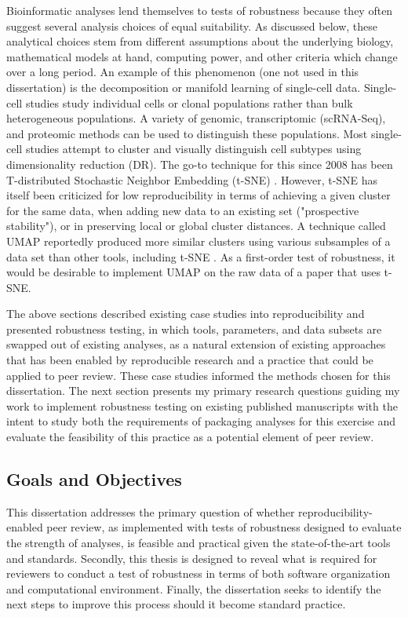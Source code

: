\documentclass{drexelthesis}
\begin{document}
Bioinformatic analyses lend themselves to tests of robustness because they often suggest several analysis choices of equal suitability. As discussed below, these analytical choices stem from different assumptions about the underlying biology, mathematical models at hand, computing power, and other criteria which change over a long period. An example of this phenomenon (one not used in this dissertation) is the decomposition or manifold learning of single-cell data. Single-cell studies study individual cells or clonal populations rather than bulk heterogeneous populations. A variety of genomic, transcriptomic (scRNA-Seq), and proteomic methods can be used to distinguish these populations. Most single-cell studies attempt to cluster and visually distinguish cell subtypes using dimensionality reduction (DR). The go-to technique for this since 2008 has been T-distributed Stochastic Neighbor Embedding (t-SNE) \cite{Van_der_Maaten2008-bm}. However, t-SNE has itself been criticized for low reproducibility in terms of achieving a given cluster for the same data, when adding new data to an existing set ("prospective stability"), or in preserving local or global cluster distances. A technique called UMAP reportedly produced more similar clusters using various subsamples of a data set than other tools, including t-SNE \cite{Becht2018-df}. As a first-order test of robustness, it would be desirable to implement UMAP on the raw data of a paper that uses t-SNE.

The above sections described existing case studies into reproducibility and presented robustness testing, in which tools, parameters, and data subsets are swapped out of existing analyses, as a natural extension of existing approaches that has been enabled by reproducible research and a practice that could be applied to peer review. These case studies informed the methods chosen for this dissertation. The next section presents my primary research questions guiding my work to implement robustness testing on existing published manuscripts with the intent to study both the requirements of packaging analyses for this exercise and evaluate the feasibility of this practice as a potential element of peer review.

\subsection{Goals and Objectives}

This dissertation addresses the primary question of whether reproducibility-enabled peer review, as implemented with tests of robustness designed to evaluate the strength of analyses, is feasible and practical given the state-of-the-art tools and standards. Secondly, this thesis is designed to reveal what is required for reviewers to conduct a test of robustness in terms of both software organization and computational environment. Finally, the dissertation seeks to identify the next steps to improve this process should it become standard practice.
\end{document}
